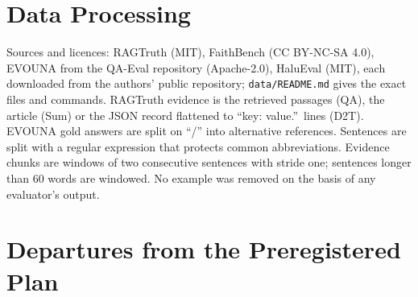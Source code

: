 \section{Data Processing}
\label{app:data}

Sources and licences: RAGTruth (MIT), FaithBench (CC BY-NC-SA 4.0), EVOUNA from the QA-Eval repository (Apache-2.0), HaluEval (MIT), each downloaded from the authors' public repository; \texttt{data/README.md} gives the exact files and commands. RAGTruth evidence is the retrieved passages (QA), the article (Sum) or the JSON record flattened to ``key: value.''\ lines (D2T). EVOUNA gold answers are split on ``/'' into alternative references. Sentences are split with a regular expression that protects common abbreviations. Evidence chunks are windows of two consecutive sentences with stride one; sentences longer than 60 words are windowed. No example was removed on the basis of any evaluator's output.

\section{Departures from the Preregistered Plan}
\label{app:deviations}

